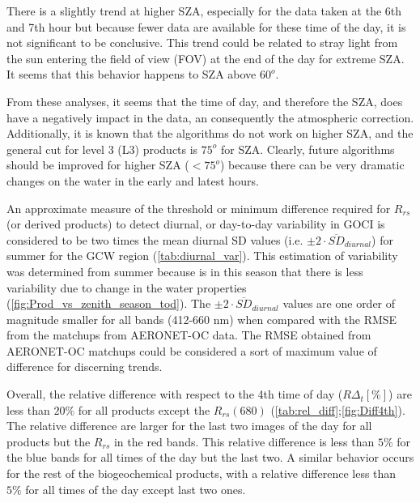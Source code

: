 \documentclass[onecolumn,3p,letterpaper,11pt]{elsarticle}
\begin{document}
There is a slightly trend at higher SZA, especially for the data taken at the 6th and 7th hour but because fewer data are available for these time of the day, it is not significant to be conclusive. 
This trend could be related to stray light from the sun entering the field of view (FOV) at the end of the day for extreme SZA. 
It seems that this behavior happens to SZA above $60^o$. 

From these analyses, it seems that the time of day, and therefore the SZA, does have a negatively impact in the data, an consequently the atmospheric correction. 
Additionally, it is known that the algorithms do not work on higher SZA, and the general cut for level 3 (L3) products is $75^o$ for SZA. 
Clearly, future algorithms should be improved for higher SZA ($<75^o$) because there can be very dramatic changes on the water in the early and latest hours.

An approximate measure of the threshold or minimum difference required for $R_{rs}$ (or derived products) to detect diurnal, or day-to-day variability in GOCI is considered to be two times the mean diurnal SD values (i.e. $\pm2\cdot \overline{SD}_{diurnal}$) for summer for the GCW region (\autoref{tab:diurnal_var}).
This estimation of variability was determined from summer because is in this season that there is less variability due to change in the water properties (\autoref{fig:Prod_vs_zenith_season_tod}).
The $\pm2\cdot \overline{SD}_{diurnal}$ values are one order of magnitude smaller for all bands (412-660 nm) when compared with the RMSE from the matchups from AERONET-OC data.
The RMSE obtained from AERONET-OC matchups could be considered a sort of maximum value of difference for discerning trends.

Overall, the relative difference with respect to the 4th time of day ($R\Delta_t[\%]$) are less than $20\%$ for all products except the $R_{rs}(680)$ (\autoref{tab:rel_diff};\autoref{fig:Diff4th}). 
The relative difference are larger for the last two images of the day for all products but the $R_{rs}$ in the red bands. 
This relative difference is less than $5\%$ for the blue bands for all times of the day but the last two. 
A similar behavior occurs for the rest of the biogeochemical products, with a relative difference less than $5\%$ for all times of the day except last two ones. 
\end{document}
